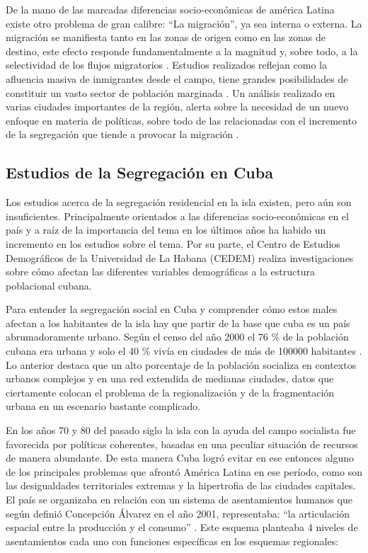 De la mano de las marcadas diferencias socio-económicas de américa Latina existe otro problema de gran calibre: “La migración”, ya sea interna o externa. La migración se manifiesta tanto en las zonas de origen como en las zonas de destino, este efecto responde fundamentalmente a la magnitud y, sobre todo, a la selectividad de los flujos migratorios \cite{Vignoli2011MigracinIE}. Estudios realizados reflejan como la afluencia masiva de inmigrantes desde el campo, tiene grandes posibilidades de constituir un vasto sector de población marginada \cite{Elizaga1972MigracionesIE}. Un análisis realizado en varias ciudades importantes de la región, alerta sobre la necesidad de un nuevo enfoque en materia de políticas, sobre todo de las relacionadas con el incremento de la segregación que tiende a provocar la migración \cite{Vignoli2011MigracinIE}.




\subsection{Estudios de la Segregación en Cuba}

Los estudios acerca de la segregación residencial en la isla existen, pero aún son insuficientes. Principalmente orientados a las diferencias socio-económicas en el país y a raíz de la importancia del tema
en los últimos años ha habido un incremento en los estudios sobre el tema. Por su parte, el Centro de
Estudios Demográficos de la Universidad de La Habana (CEDEM) realiza investigaciones sobre cómo afectan las 
diferentes variables demográficas a la estructura poblacional cubana.  

Para entender la segregación social en Cuba y comprender cómo estos males afectan a los habitantes de la isla hay que partir de la base que cuba es un país abrumadoramente urbano. Según el censo del año 2000 el 76 \% de la población cubana era urbana y solo el 40 \% vivía en ciudades de más de 100000 habitantes \cite{CONEI2000}. Lo anterior destaca que un alto porcentaje de la población socializa en contextos urbanos complejos y en una red extendida de medianas ciudades, datos que ciertamente colocan el problema de la regionalización y de la fragmentación urbana en un escenario bastante complicado.

En los años 70 y 80 del pasado siglo la isla con la ayuda del campo socialista fue favorecida por políticas coherentes, basadas en una peculiar situación de recursos de manera abundante. De esta manera Cuba logró evitar en ese entonces alguno de los principales problemas que afrontó América Latina en ese período, como son las desigualdades territoriales extremas y la hipertrofia de las ciudades capitales. El país se organizaba en relación con un sistema de asentamientos humanos que según definió Concepción Álvarez en el año 2001, representaba: “la articulación espacial entre la producción y el consumo” \cite{AC2001}. Este esquema planteaba 4 niveles de asentamientos cada uno con funciones específicas en los esquemas regionales:

